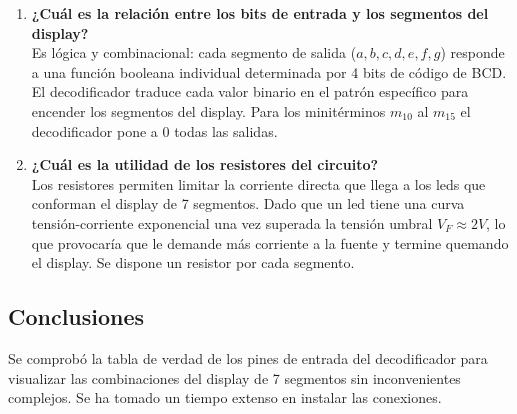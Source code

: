 \begin{enumerate}
    \item \textbf{¿Cuál es la relación entre los bits de entrada y los segmentos del display?}\\ 
        \sangria{}Es lógica y combinacional: cada segmento de salida ($a,b,c,d,e,f,g$) responde a una función booleana individual determinada por 4 bits de código de BCD. El decodificador traduce cada valor binario en el patrón específico para encender los segmentos del display. Para los minitérminos $m_{10}$ al $m_{15}$ el decodificador pone a $0$ todas las salidas.
    \item \textbf{¿Cuál es la utilidad de los resistores del circuito?}\\
        \sangria{} Los resistores permiten limitar la corriente directa que llega a los leds que conforman el display de 7 segmentos. Dado que un led tiene una curva tensión-corriente exponencial una vez superada la tensión umbral $V_F \approx 2V$, lo que provocaría que le demande más corriente a la fuente y termine quemando el display. Se dispone un resistor por cada segmento.
\end{enumerate}

\subsection{Conclusiones}
\sangria{} Se comprobó la tabla de verdad de los pines de entrada del decodificador para visualizar las combinaciones del display de 7 segmentos sin inconvenientes complejos. Se ha tomado un tiempo extenso en instalar las conexiones.
